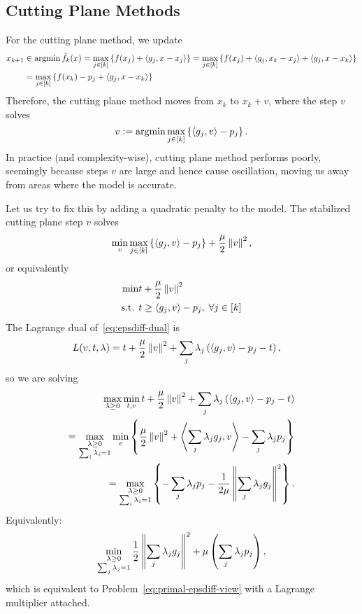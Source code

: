 \subsection{Cutting Plane Methods}
For the cutting plane method, we update
\begin{align*}
	x_{k+1} & \in \operatorname*{argmin} \hat{f}_k(x) = \max_{j \in [k]} \left\{ 
	f(x_j) + \left\langle g_j, x - x_j \right\rangle  \right\} = \max_{j \in [k]}
	\left\{ f(x_j) + \left\langle g_j, x_k - x_j \right\rangle + \left\langle g_j, x - x_k \right\rangle \right\} \\
			&= \max_{j \in [k]} \left\{ f(x_k) - p_j + \left\langle g_j, x - x_k \right\rangle \right\}
\end{align*}
Therefore, the cutting plane method moves from $x_k$ to $x_k + v$, where the
step $v$ solves
\[
	v := \operatorname*{argmin} \max_{j \in [k]} \left\{ \left\langle g_j, v \right\rangle - p_j \right\}.
\]
In practice (and complexity-wise), cutting plane method performs poorly,
seemingly because steps $v$ are large and hence cause oscillation, moving us
away from areas where the model is accurate.

Let us try to fix this by adding a quadratic penalty to the model. The
stabilized cutting plane step $v$ solves
\[
	\min_v \max_{j \in [k]} \left\{ \left\langle g_j, v \right\rangle - p_j \right\} + \frac{\mu}{2} \left \| v \right \|^2,
\]
or equivalently
\begin{align}
	\begin{aligned}
		\min & t + \frac{\mu}{2} \left \| v \right \|^2 \\
		\mbox{s.t. } & t \geq \left\langle g_j, v \right\rangle - p_j, \; \forall j \in [k]
	\end{aligned}
	\label{eq:epsdiff-dual}
\end{align}
The Lagrange dual of~\ref{eq:epsdiff-dual} is
\begin{align*}
	L(v, t, \lambda) &= t + \frac{\mu}{2} \left \| v \right \|^2 + \sum_j \lambda_j
	\left( \left\langle g_j, v \right\rangle - p_j - t \right),
\end{align*}
so we are solving
\begin{align*}
	\max_{\lambda \geq 0} \min_{t, v} t + \frac{\mu}{2} \left \| v \right \|^2 +
		\sum_j \lambda_j \left(\left\langle g_j, v \right\rangle - p_j - t\right) \\
	= \max_{\substack{\lambda \geq 0 \\ \sum_i \lambda_i = 1}}
	  \min_{v} \left\{ \frac{\mu}{2} \left \| v \right \|^2 + \left\langle \sum_j \lambda_j g_j, v \right\rangle
	  - \sum_j \lambda_j p_j  \right\} \\
	= \max_{\substack{\lambda \geq 0 \\ \sum_i \lambda_i = 1}}
	\left\{ -\sum_j \lambda_j p_j - \frac{1}{2 \mu} \left \| \sum_j \lambda_j
	g_j \right \|^2 \right\}.
\end{align*}
Equivalently:
\[
	\min_{\substack{\lambda \geq 0 \\ \sum_j \lambda_j = 1}}
	\frac{1}{2} \left \| \sum_j \lambda_j g_j \right \|^2 + \mu\left(
	\sum_j \lambda_j p_j \right),
\]
which is equivalent to Problem~\ref{eq:primal-epsdiff-view} with a Lagrange
multiplier attached.
